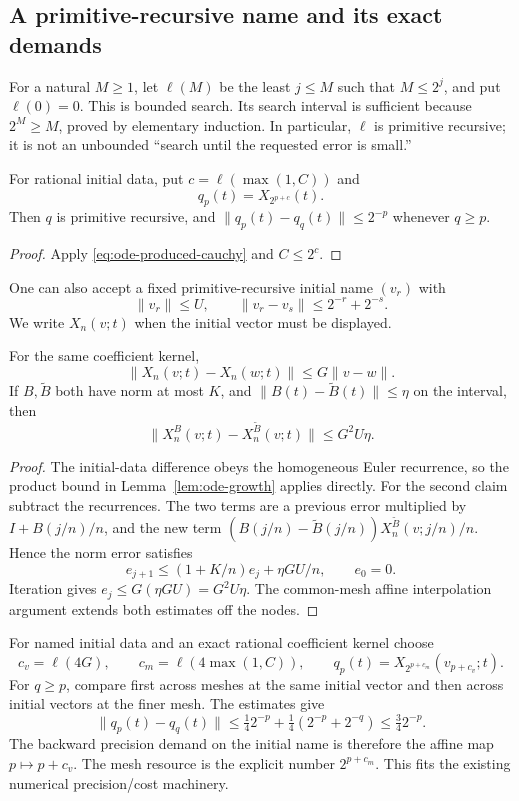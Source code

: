\subsection{A primitive-recursive name and its exact demands}

For a natural $M\ge1$, let $\ell(M)$ be the least $j\le M$ such that
$M\le2^j$, and put $\ell(0)=0$. This is bounded search. Its search interval
is sufficient because $2^M\ge M$, proved by elementary induction. In
particular, $\ell$ is primitive recursive; it is not an unbounded
``search until the requested error is small.''

\begin{corollary}\label{cor:ode-regular-name}
For rational initial data, put $c=\ell(\max(1,C))$ and
\[
 q_p(t)=X_{2^{p+c}}(t).
\]
Then $q$ is primitive recursive, and
$\lVert q_p(t)-q_q(t)\rVert\le2^{-p}$ whenever $q\ge p$.
\end{corollary}
\begin{proof}
Apply \eqref{eq:ode-produced-cauchy} and $C\le2^c$.
\end{proof}

One can also accept a fixed primitive-recursive initial name $(v_r)$ with
\[
 \lVert v_r\rVert\le U,\qquad
 \lVert v_r-v_s\rVert\le2^{-r}+2^{-s}.
\]
We write $X_n(v;t)$ when the initial vector must be displayed.

\begin{lemma}\label{lem:ode-stability}
For the same coefficient kernel,
\[
 \lVert X_n(v;t)-X_n(w;t)\rVert\le G\lVert v-w\rVert.
\]
If $B,\widetilde B$ both have norm at most $K$, and
$\lVert B(t)-\widetilde B(t)\rVert\le\eta$ on the interval, then
\[
 \lVert X_n^B(v;t)-X_n^{\widetilde B}(v;t)\rVert
 \le G^2U\eta.
\]
\end{lemma}
\begin{proof}
The initial-data difference obeys the homogeneous Euler recurrence, so the
product bound in Lemma~\ref{lem:ode-growth} applies directly. For the second
claim subtract the recurrences. The two terms are a previous error multiplied
by $I+B(j/n)/n$, and the new term
$(B(j/n)-\widetilde B(j/n))X_n^{\widetilde B}(v;j/n)/n$.
Hence the norm error satisfies
\[
 e_{j+1}\le(1+K/n)e_j+\eta GU/n,\qquad e_0=0.
\]
Iteration gives $e_j\le G(\eta GU)=G^2U\eta$. The common-mesh affine
interpolation argument extends both estimates off the nodes.
\end{proof}

For named initial data and an exact rational coefficient kernel choose
\begin{equation}\label{eq:ode-demands}
 c_v=\ell(4G),\qquad c_m=\ell(4\max(1,C)),\qquad
 q_p(t)=X_{2^{p+c_m}}(v_{p+c_v};t).
\end{equation}
For $q\ge p$, compare first across meshes at the same initial vector and
then across initial vectors at the finer mesh. The estimates give
\[
 \lVert q_p(t)-q_q(t)\rVert
 \le\tfrac14 2^{-p}
      +\tfrac14(2^{-p}+2^{-q})
 \le\tfrac34 2^{-p}.
\]
The backward precision demand on the initial name is therefore the affine
map $p\mapsto p+c_v$. The mesh resource is the explicit number
$2^{p+c_m}$. This fits the existing numerical precision/cost machinery.

